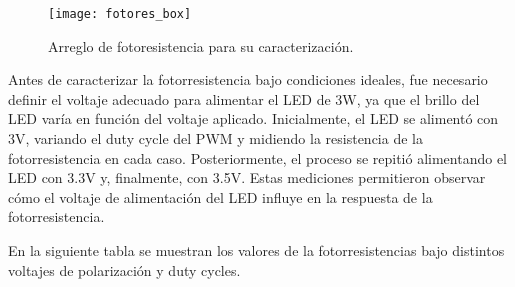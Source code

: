             \begin{figure}[hbtp]
                \centering
                \texttt{[image: fotores\_box]}
                \caption{Arreglo de fotoresistencia para su caracterización.}
                \label{fig:fotores_box}
            \end{figure}

Antes de caracterizar la fotorresistencia bajo condiciones ideales, fue necesario definir el voltaje adecuado para alimentar el LED de 3W, ya que el brillo del LED varía en función del voltaje aplicado. Inicialmente, el LED se alimentó con 3V, variando el duty cycle del PWM y midiendo la resistencia de la fotorresistencia en cada caso. Posteriormente, el proceso se repitió alimentando el LED con 3.3V y, finalmente, con 3.5V. Estas mediciones permitieron observar cómo el voltaje de alimentación del LED influye en la respuesta de la fotorresistencia.


En la siguiente tabla se muestran los valores de la fotorresistencias bajo distintos voltajes de polarización y duty cycles.
\newpage
            \begin{table}[htbp]
                \caption{Valor de fotorresistencias con diferentes duty cycles.}
                \begin{center}
                \label{tab:Duty_cycle}
                \end{center}
            \end{table}

